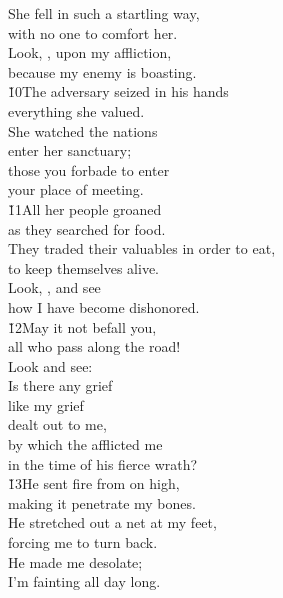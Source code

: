 \begin{poetry}
\poeml She fell in such a startling way, \\
\poemll    with no one to comfort her. \\
\poeml Look, , upon my affliction, \\
\poemll    because my enemy is boasting. \\
\poeml \v{10}The adversary seized in his hands \\
\poemll    everything she valued. \\
\poeml She watched the nations \\
\poemll    enter her sanctuary; \\
\poeml those you forbade to enter \\
\poemll    your place of meeting. \\
\poeml \v{11}All her people groaned \\
\poemll    as they searched for food. \\
\poeml They traded their valuables in order to eat, \\
\poemll    to keep themselves alive. \\
\poeml Look, , and see \\
\poemll    how I have become dishonored. \\
\poeml \v{12}May it not befall you, \\
\poemll    all who pass along the road! \\
\poeml Look and see: \\
\poemll    Is there any grief \\
\poeml like my grief \\
\poemll    dealt out to me, \\
\poeml by which the  afflicted me \\
\poemll    in the time of his fierce wrath? \\
\poeml \v{13}He sent fire from on high, \\
\poemll    making it penetrate my bones. \\
\poeml He stretched out a net at my feet, \\
\poemll    forcing me to turn back. \\
\poeml He made me desolate; \\
\poemll    I'm fainting all day long. \\

\end{poetry}
